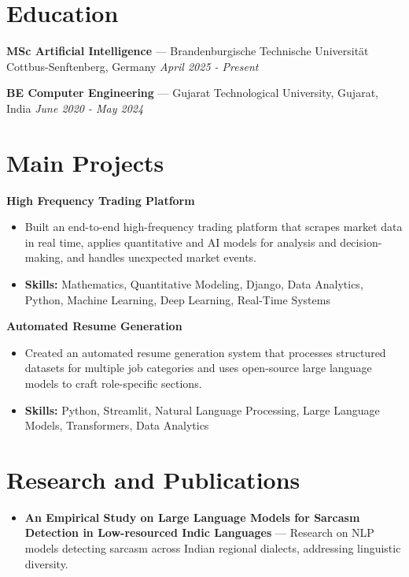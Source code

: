 \documentclass[a4paper,10pt]{article}
\begin{document}
\section*{Education}
\textbf{MSc Artificial Intelligence} — Brandenburgische Technische Universität Cottbus-Senftenberg, Germany \hfill \textit{April 2025 - Present}\par
\vspace{1.5pt}
\textbf{BE Computer Engineering} — Gujarat Technological University, Gujarat, India \hfill \textit{June 2020 - May 2024}\par

\section*{Main Projects}
\textbf{High Frequency Trading Platform}\par
\vspace{1pt}
\begin{itemize}
  \item Built an end-to-end high-frequency trading platform that scrapes market data in real time, applies quantitative and AI models for analysis and decision-making, and handles unexpected market events.
  \item \textbf{Skills:} Mathematics, Quantitative Modeling, Django, Data Analytics, Python, Machine Learning, Deep Learning, Real-Time Systems
\end{itemize}
\vspace{3pt}
\textbf{Automated Resume Generation}\par
\vspace{1pt}
\begin{itemize}
  \item Created an automated resume generation system that processes structured datasets for multiple job categories and uses open-source large language models to craft role-specific sections.
  \item \textbf{Skills:} Python, Streamlit, Natural Language Processing, Large Language Models, Transformers, Data Analytics
\end{itemize}

\section*{Research and Publications}
\begin{itemize}
\item \textbf{An Empirical Study on Large Language Models for Sarcasm Detection in Low-resourced Indic Languages} — Research on NLP models detecting sarcasm across Indian regional dialects, addressing linguistic diversity.
\end{itemize}
\end{document}

